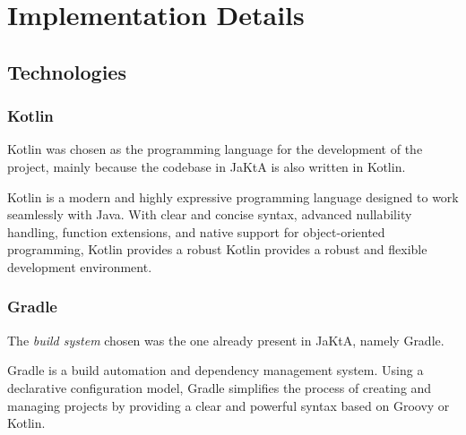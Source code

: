 \section{Implementation Details}

\subsection{Technologies}

\subsubsection{Kotlin}
Kotlin\cite{kotlin} was chosen as the programming language for the development of the project, mainly because the
codebase in JaKtA is also written in Kotlin.

Kotlin is a modern and highly expressive programming language designed to work seamlessly with Java\cite{java}.
With clear and concise syntax, advanced nullability handling, function extensions, and native support for object-oriented programming, Kotlin provides a robust
Kotlin provides a robust and flexible development environment.

\subsubsection{Gradle}
The \textit{build system} chosen was the one already present in JaKtA, namely Gradle\cite{gradle}.

Gradle is a build automation and dependency management system. Using a declarative configuration model, Gradle
simplifies the process of creating and managing projects by providing a clear and powerful syntax based on Groovy\cite{groovy} or Kotlin.

